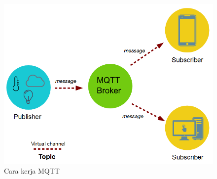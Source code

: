 \begin{figure}[H]
	\centering
	\includegraphics[scale=0.45]{images/mqtt.png}
	\caption{Cara kerja MQTT}
\end{figure}

